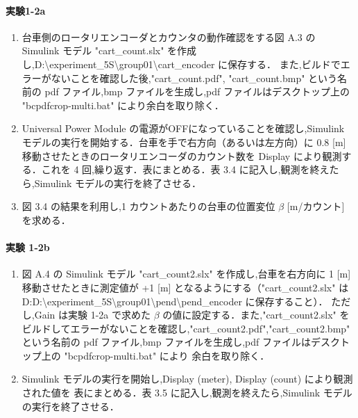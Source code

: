 \paragraph{実験1-2a}
\begin{enumerate}
  \item 台車側のロータリエンコーダとカウンタの動作確認をする図 A.3 の Simulink モデル
        "cart\_count.slx" を作成し,D:\textbackslash experiment\_5S\textbackslash group01\textbackslash cart\_encoder に保存する．
        また,ビルドでエラーがないことを確認した後,"cart\_count.pdf", "cart\_count.bmp" 
        という名前の pdf ファイル,bmp ファイルを生成し,pdf ファイルはデスクトップ上の 
        "bcpdfcrop-multi.bat" により余白を取り除く．
        
  \item Universal Power Module の電源がOFFになっていることを確認し,Simulink モデルの実行を開始する．台車を手で右方向（あるいは左方向）に 0.8 [m] 移動させたときのロータリエンコーダのカウント数を Display により観測する．これを 4 回,繰り返す．表にまとめる．表 3.4 に記入し,観測を終えたら,Simulink モデルの実行を終了させる．
        
  \item 図 3.4 の結果を利用し,1 カウントあたりの台車の位置変位 \( \beta \) [m/カウント] を求める．
\end{enumerate}

\paragraph{実験 1-2b}
\begin{enumerate}
  \item 図 A.4 の Simulink モデル "cart\_count2.slx" を作成し,台車を右方向に 1 [m] 移動させたときに測定値が
        +1 [m] となるようにする（"cart\_count2.slx" は D:D:\textbackslash experiment\_5S\textbackslash group01\textbackslash pend\textbackslash pend\_encoder に保存すること）．
        ただし,Gain は実験 1-2a で求めた \(\beta\) の値に設定する．また,"cart\_count2.slx" を
        ビルドしてエラーがないことを確認し,"cart\_count2.pdf","cart\_count2.bmp" という名前の 
        pdf ファイル,bmp ファイルを生成し,pdf ファイルはデスクトップ上の "bcpdfcrop-multi.bat" により
        余白を取り除く．\\
        
  \item Simulink モデルの実行を開始し,Display (meter), Display (count) により観測された値を
        表にまとめる．表 3.5 に記入し,観測を終えたら,Simulink モデルの実行を終了させる．
        
\end{enumerate}


